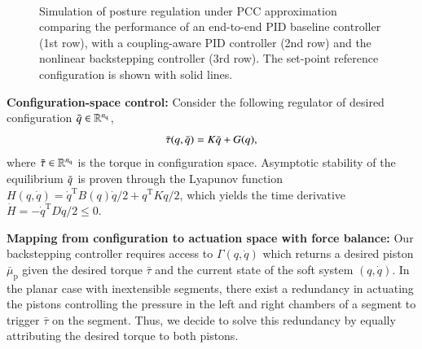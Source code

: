 \begin{figure}[ht]
  \\
  \caption{Simulation of posture regulation under \gls{PCC} approximation comparing the performance of an end-to-end PID baseline controller (1st row), with a coupling-aware PID controller (2nd row) and the nonlinear backstepping controller (3rd row). The set-point reference configuration is shown with solid lines.}
  \label{fig:backstepping:time_series_plots}
\end{figure}

\textbf{Configuration-space control:}
%
Consider the following regulator of desired configuration $\Bar{q} \in \mathbb{R}^{n_\mathrm{q}}$, 
%
\begin{equation}\small\label{eq:backstepping:high_level_regulation}
    \Bar{\tau}(q, \Bar{q}) = K \Bar{q} + G(q),
\end{equation}
%
where $\Bar{\tau} \in \mathbb{R}^{n_\mathrm{q}}$ is the torque in configuration space. %
%
Asymptotic stability of the equilibrium $\Bar{q}$ is proven through the Lyapunov function $H(q, \dot{q}) = \dot{q}^{\mathrm{T}} B(q) \dot{q}/2 + q^\mathrm{T} K q/2$, which yields the time derivative $\dot{H} = -\dot{q}^\mathrm{T} D \dot{q}/2 \leq 0$.

\textbf{Mapping from configuration to actuation space with force balance:}
Our backstepping controller requires access to $\Gamma(q,\dot{q})$ which returns a desired piston $\bar{\mu}_\mathrm{p}$ given the desired torque $\bar{\tau}$ and the current state of the soft system $(q,\dot{q})$. In the planar case with inextensible segments, there exist a redundancy in actuating the pistons controlling the pressure in the left and right chambers of a segment to trigger $\bar{\tau}$ on the segment. Thus, we decide to solve this redundancy by equally attributing the desired torque to both pistons.

